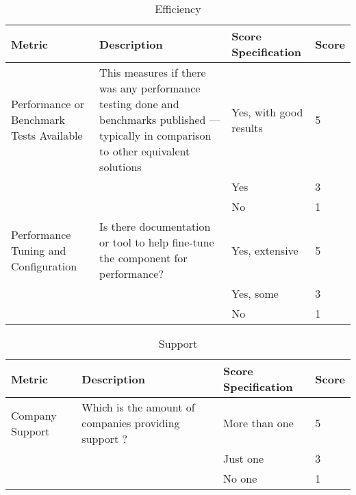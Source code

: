 \documentclass[11pt]{article}
\begin{document}
\begin{table}[H]
  \begin{center}
    \begin{tabular}{ | p{3cm} | p{5cm} | p{3cm} | l | }
    \hline
    Metric & Description & Score Specification & Score \\
    \hline
    Performance or Benchmark Tests Available & This measures if there was any performance testing done and benchmarks published — typically in comparison to other equivalent solutions & Yes, with good results & 5 \\ \cline{3-3} \cline{4-4} 
    & & Yes & 3 \\ \cline{3-3}\cline{4-4}
    & & No & 1 \\ 
    \hline
    Performance Tuning and Configuration & Is there documentation or tool to help fine-tune the component for performance? & Yes, extensive & 5 \\ \cline{3-3} \cline{4-4} 
    & & Yes, some & 3 \\ \cline{3-3}\cline{4-4}
    & & No & 1 \\ 
    \hline
    \end{tabular}
    \caption{Efficiency}
    \label{tab:efficiency}
  \end{center}
\end{table}

\begin{table}[H]
  \begin{center}
    \begin{tabular}{ | p{3cm} | p{5cm} | p{3cm} | l | }
    \hline
    Metric & Description & Score Specification & Score \\
    \hline
    Company Support & Which is the amount of companies providing support ? & More than one & 5 \\ \cline{3-3} \cline{4-4} 
    & & Just one & 3 \\ \cline{3-3}\cline{4-4}
    & & No one & 1 \\ 
    \hline
    \end{tabular}
    \caption{Support}
    \label{tab:support}
  \end{center}
\end{table}
\end{document}
